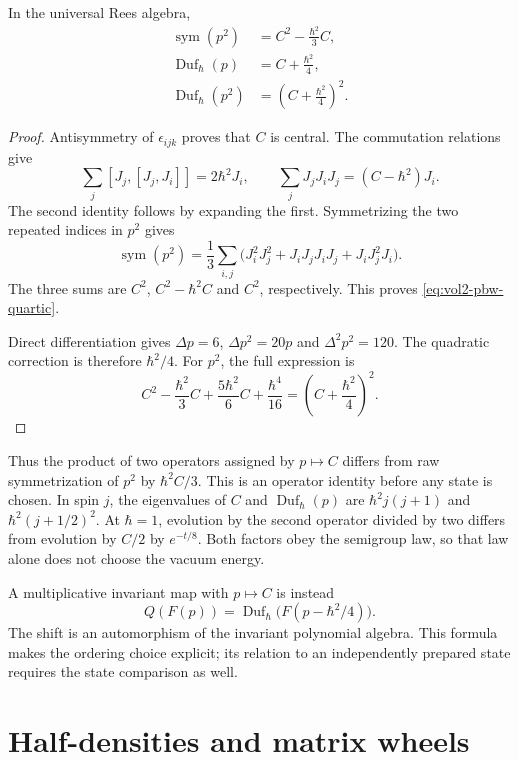 \begin{proposition}\label{prop:vol2-duflo-quartic}
In the universal Rees algebra,
\begin{align}
 \operatorname{sym}(p^2)&=C^2-\frac{\hbar^2}{3}C,
       \label{eq:vol2-pbw-quartic}\\
 \operatorname{Duf}_\hbar(p)&=C+\frac{\hbar^2}{4},
       \label{eq:vol2-duflo-compact-quadratic}\\
 \operatorname{Duf}_\hbar(p^2)
       &=\left(C+\frac{\hbar^2}{4}\right)^2.
       \label{eq:vol2-duflo-compact-quartic}
\end{align}
\end{proposition}
\begin{proof}
Antisymmetry of $\epsilon_{ijk}$ proves that $C$ is
central. The commutation relations give
\[
 \sum_j[J_j,[J_j,J_i]]=2\hbar^2J_i,
 \qquad
 \sum_jJ_jJ_iJ_j=(C-\hbar^2)J_i.
\]
The second identity follows by expanding the first.
Symmetrizing the two repeated indices in $p^2$ gives
\[
 \operatorname{sym}(p^2)
 =\frac13\sum_{i,j}
 \bigl(J_i^2J_j^2+J_iJ_jJ_iJ_j+J_iJ_j^2J_i\bigr).
\]
The three sums are $C^2$, $C^2-\hbar^2C$ and $C^2$,
respectively. This proves \eqref{eq:vol2-pbw-quartic}.

Direct differentiation gives
$\Delta p=6$, $\Delta p^2=20p$ and
$\Delta^2p^2=120$.
The quadratic correction is therefore $\hbar^2/4$.
For $p^2$, the full expression is
\[
 C^2-\frac{\hbar^2}{3}C
      +\frac{5\hbar^2}{6}C+\frac{\hbar^4}{16}
 =\left(C+\frac{\hbar^2}{4}\right)^2.
\]
\end{proof}

Thus the product of two operators assigned by $p\mapsto C$
differs from raw symmetrization of $p^2$ by
$\hbar^2C/3$.
This is an operator identity before any state is chosen.
In spin $j$, the eigenvalues of $C$ and
$\operatorname{Duf}_\hbar(p)$ are
$\hbar^2j(j+1)$ and $\hbar^2(j+1/2)^2$.
At $\hbar=1$, evolution by the second operator divided
by two differs from evolution by $C/2$ by $e^{-t/8}$.
Both factors obey the semigroup law, so that law alone
does not choose the vacuum energy.

A multiplicative invariant map with $p\mapsto C$ is
instead
\[
 Q(F(p))=
 \operatorname{Duf}_\hbar
       \bigl(F(p-\hbar^2/4)\bigr).
\]
The shift is an automorphism of the invariant polynomial
algebra. This formula makes the ordering choice explicit;
its relation to an independently prepared state requires
the state comparison as well.

\section{Half-densities and matrix wheels}
\label{sec:vol2-half-density-wheels}


